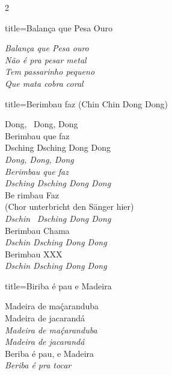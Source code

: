 \documentclass[fontsize=14pt, paper=a4, twoside, DIV=20]{scrreprt} %
\begin{document}
\begin{multicols*}{2}
\begin{song}{title={Balança que Pesa Ouro}}
\begin{verse*}
        \textit{Balança que Pesa ouro \\
        Não é pra pesar metal \\
        Tem passarinho pequeno \\
        Que mata cobra coral} \\
        \end{verse*}
\end{song}

\columnbreak
\begin{song}{title={Berimbau faz (Chin Chin Dong Dong)}}
        \begin{verse*}
            Dong, \ Dong, Dong\\
            Berimbau que faz\\
            Dsching Dsching Dong Dong\\
            \textit{Dong, Dong, Dong\\
            Berimbau que faz\\
            Dsching Dsching Dong Dong}\\
            Be rimbau Faz \\
            (Chor unterbricht den Sänger hier)\\
            \textit{Dschin} \ \textit{Dsching Dong Dong}\\
            Berimbau Chama\\
            \textit{Dschin Dsching Dong Dong}\\
            Berimbau XXX\\
            \textit{Dschin Dsching Dong Dong}\\
        \end{verse*}
\end{song}

 \begin{song}{title={Biriba é pau e Madeira}}
         \begin{verse*}
             Madeira de maḉaranduba\\
             Madeira de jacarandá\\
             \textit{Madeira de maḉaranduba}\\
             \textit{Madeira de jacarandá}\\
             Beriba é pau, e Madeira\\
             \textit{Beriba é pra tocar}\\
         \end{verse*}
 \end{song}


\end{multicols*}
\end{document}
